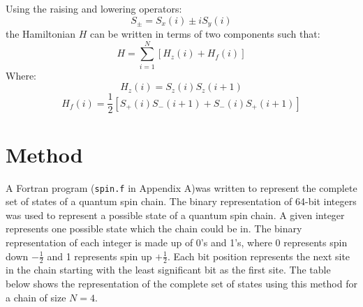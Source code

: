 \documentclass[a4paper]{IEEEtran}
\begin{document}
    Using the raising and lowering operators:
        \[ S_{\pm} = S_x(i) \pm iS_y(i) \]
    the Hamiltonian $H$ can be written in terms of two components such that:
        \[ H = \sum_{i=1}^{N} \left[ H_z(i) + H_f(i) \right] \]
    Where:
    \[ H_z(i) = S_z(i)S_z(i+1) \]
    \[ H_f(i) = \frac{1}{2} \left[ S_{+}(i)S_{-}(i+1) + S_{-}(i)S_{+}(i+1) \right]  \]


\section{Method}

    A Fortran program (\texttt{spin.f} in Appendix A)was written to represent the 
    complete set of states of a 
    quantum spin chain. The binary representation of 64-bit integers was used 
    to represent a possible state of a quantum spin chain. A given integer
    represents one possible state which the chain could be in. The binary representation
    of each integer is made up of 0's and 1's, where 0 represents spin down $-\frac{1}{2}$
    and 1 represents spin up $+\frac{1}{2}$. Each bit position represents the next site
    in the chain starting with the least significant bit as the first site.
    The table below shows the representation of the complete set of states using this method
    for a chain of size $N = 4$.
\end{document}

